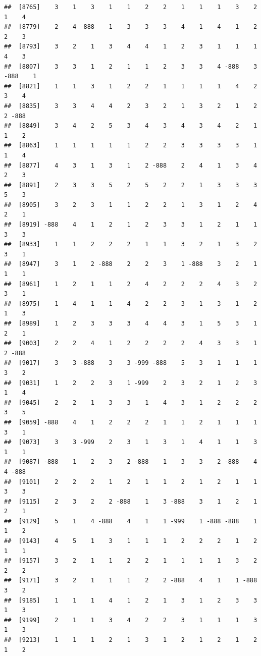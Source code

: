 \documentclass[
  12pt,
  openany]{book}
\begin{document}
\begin{verbatim}
##  [8765]    3    1    3    1    1    2    2    1    1    1    3    2    1    4
##  [8779]    2    4 -888    1    3    3    3    4    1    4    1    2    2    3
##  [8793]    3    2    1    3    4    4    1    2    3    1    1    1    4    3
##  [8807]    3    3    1    2    1    1    2    3    3    4 -888    3 -888    1
##  [8821]    1    1    3    1    2    2    1    1    1    1    4    2    3    4
##  [8835]    3    3    4    4    2    3    2    1    3    2    1    2    2 -888
##  [8849]    3    4    2    5    3    4    3    4    3    4    2    1    1    2
##  [8863]    1    1    1    1    1    2    2    3    3    3    3    1    1    4
##  [8877]    4    3    1    3    1    2 -888    2    4    1    3    4    2    3
##  [8891]    2    3    3    5    2    5    2    2    1    3    3    3    5    3
##  [8905]    3    2    3    1    1    2    2    1    3    1    2    4    2    1
##  [8919] -888    4    1    2    1    2    3    3    1    2    1    1    3    3
##  [8933]    1    1    2    2    2    1    1    3    2    1    3    2    3    1
##  [8947]    3    1    2 -888    2    2    3    1 -888    3    2    1    1    1
##  [8961]    1    2    1    1    2    4    2    2    2    4    3    2    3    1
##  [8975]    1    4    1    1    4    2    2    3    1    3    1    2    1    3
##  [8989]    1    2    3    3    3    4    4    3    1    5    3    1    2    1
##  [9003]    2    2    4    1    2    2    2    2    4    3    3    1    2 -888
##  [9017]    3    3 -888    3    3 -999 -888    5    3    1    1    1    3    2
##  [9031]    1    2    2    3    1 -999    2    3    2    1    2    3    1    4
##  [9045]    2    2    1    3    3    1    4    3    1    2    2    2    3    5
##  [9059] -888    4    1    2    2    2    1    1    2    1    1    1    3    1
##  [9073]    3    3 -999    2    3    1    3    1    4    1    1    3    1    1
##  [9087] -888    1    2    3    2 -888    1    3    3    2 -888    4    4 -888
##  [9101]    2    2    2    1    2    1    1    2    1    2    1    1    3    3
##  [9115]    2    3    2    2 -888    1    3 -888    3    1    2    1    2    1
##  [9129]    5    1    4 -888    4    1    1 -999    1 -888 -888    1    1    2
##  [9143]    4    5    1    3    1    1    1    2    2    2    1    2    1    1
##  [9157]    3    2    1    1    2    2    1    1    1    1    3    2    2    2
##  [9171]    3    2    1    1    1    2    2 -888    4    1    1 -888    3    2
##  [9185]    1    1    1    4    1    2    1    3    1    2    3    3    1    3
##  [9199]    2    1    1    3    4    2    2    3    1    1    1    3    1    3
##  [9213]    1    1    1    2    1    3    1    2    1    2    1    2    1    2

\end{verbatim}
\end{document}
